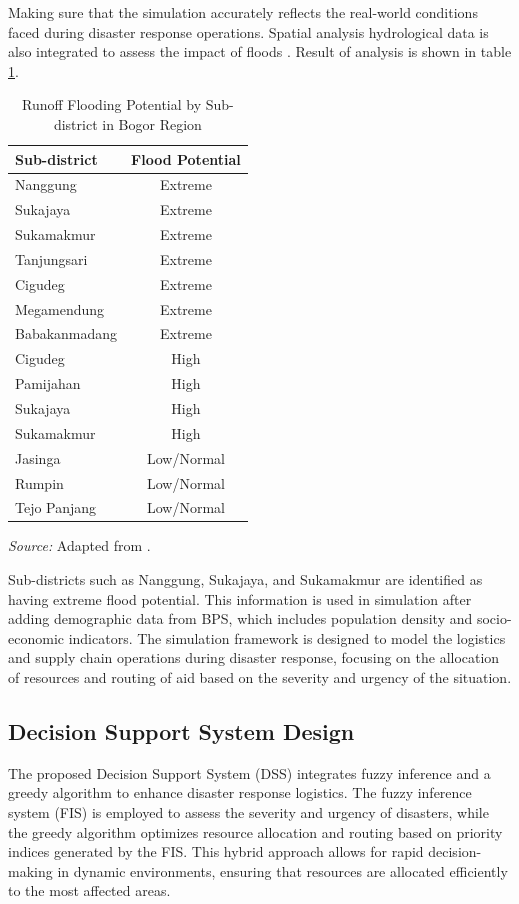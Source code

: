 \documentclass[journal,final,a4paper,twoside,11pt]{IEEEtran}
\begin{document}
Making sure that the simulation accurately reflects the real-world conditions faced during disaster response operations. Spatial analysis hydrological data is also integrated to assess the impact of floods \cite{alkaesi2021spatial}. Result of analysis is shown in table \ref{tab:analysis}.
\begin{table}[htbp]
\caption{Runoff Flooding Potential by Sub-district in Bogor Region}
\begin{center}
\begin{tabular}{|l|c|}
\hline
\textbf{Sub-district} & \textbf{Flood Potential} \\
\hline
Nanggung & Extreme \\
\hline Sukajaya & Extreme  \\
\hline Sukamakmur & Extreme  \\
\hline Tanjungsari & Extreme  \\
\hline Cigudeg & Extreme  \\
\hline Megamendung & Extreme  \\
\hline Babakanmadang & Extreme \\
\hline
Cigudeg & High\\
\hline Pamijahan & High  \\
\hline Sukajaya & High  \\
\hline Sukamakmur & High \\
\hline
\hline Jasinga & Low/Normal \\
\hline Rumpin & Low/Normal \\
\hline Tejo Panjang & Low/Normal \\
\hline
\end{tabular}
\vspace{0.2cm}

\footnotesize{\textit{Source:} Adapted from \cite{alkaesi2021spatial}.}
\label{tab:analysis}
\end{center}
\end{table}

Sub-districts such as Nanggung, Sukajaya, and Sukamakmur are identified as having extreme flood potential. This information is used in simulation after adding demographic data from BPS, which includes population density and socio-economic indicators. The simulation framework is designed to model the logistics and supply chain operations during disaster response, focusing on the allocation of resources and routing of aid based on the severity and urgency of the situation.

\subsection{Decision Support System Design}
The proposed Decision Support System (DSS) integrates fuzzy inference and a greedy algorithm to enhance disaster response logistics. The fuzzy inference system (FIS) is employed to assess the severity and urgency of disasters, while the greedy algorithm optimizes resource allocation and routing based on priority indices generated by the FIS. This hybrid approach allows for rapid decision-making in dynamic environments, ensuring that resources are allocated efficiently to the most affected areas.
\end{document}
